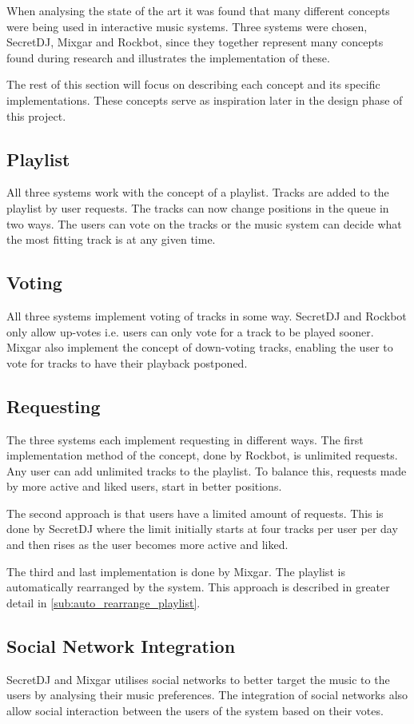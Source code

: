 When analysing the state of the art it was found that many different
concepts were being used in interactive music systems. Three systems
were chosen, SecretDJ, Mixgar and Rockbot, since they together
represent many concepts found during research and illustrates the
implementation of these.

The rest of this section will focus on describing each concept and its
specific implementations. These concepts serve as inspiration later in
the design phase of this project.

\subsection{Playlist}
All three systems work with the concept of a playlist. Tracks are
added to the playlist by user requests. The tracks can now change
positions in the queue in two ways. The users can vote on the tracks
or the music system can decide what the most fitting track is at any 
given time.

\subsection{Voting}
All three systems implement voting of tracks in some way. SecretDJ and
Rockbot only allow up-votes i.e. users can only vote for a track to be
played sooner. Mixgar also implement the concept of down-voting
tracks, enabling the user to vote for tracks to have their playback
postponed.

\subsection{Requesting}
The three systems each implement requesting in different ways. The
first implementation method of the concept, done by Rockbot, is
unlimited requests.  Any user can add unlimited tracks to the
playlist. To balance this, requests made by more active and liked
users, start in better positions.

The second approach is that users have a limited amount of
requests. This is done by SecretDJ where the limit initially starts at
four tracks per user per day and then rises as the user becomes more
active and liked.

The third and last implementation is done by Mixgar. The playlist is
automatically rearranged by the system. This approach is described in
greater detail in \cref{sub:auto_rearrange_playlist}.

\subsection{Social Network Integration}
SecretDJ and Mixgar utilises social networks to better target the
music to the users by analysing their music preferences. The
integration of social networks also allow social interaction between
the users of the system based on their votes.

